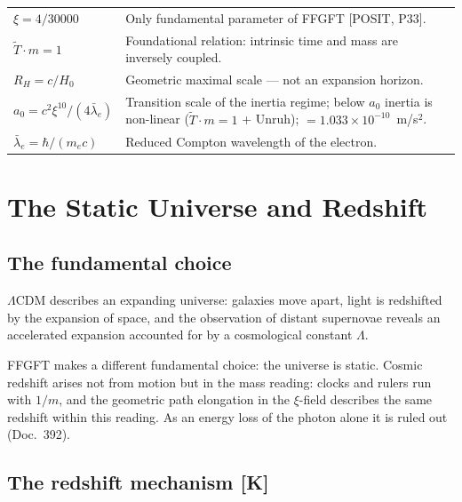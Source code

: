 \medskip
\begin{tabular}{@{}lp{10.5cm}}
$\xi = 4/30000$          & Only fundamental parameter of FFGFT
                           [POSIT, P33]. \\[4pt]
$\tilde T \cdot m = 1$   & Foundational relation: intrinsic time and
                           mass are inversely coupled. \\[4pt]
$R_H = c/H_0$            & Geometric maximal scale — not an expansion
                           horizon. \\[4pt]
$a_0 = c^2\xi^{10}/(4\bar\lambda_e)$
                         & Transition scale of the inertia regime;
                           below $a_0$ inertia is non-linear
                           ($\tilde T\cdot m=1$ + Unruh);
                           $= 1.033\times10^{-10}$~m/s$^2$. \\[4pt]
$\bar\lambda_e = \hbar/(m_e c)$
                         & Reduced Compton wavelength of the electron. \\
\end{tabular}

\chapter{The Static Universe and Redshift}

\section{The fundamental choice}

$\Lambda$CDM describes an expanding universe: galaxies move apart, light
is redshifted by the expansion of space, and the observation of distant
supernovae reveals an accelerated expansion accounted for by a cosmological
constant $\Lambda$.

FFGFT makes a different fundamental choice: the universe is static.
Cosmic redshift arises not from motion but in the mass reading: clocks and
rulers run with $1/m$, and the geometric path elongation in the $\xi$-field
describes the same redshift within this reading. As an energy loss of the
photon alone it is ruled out (Doc.~392).

\section{The redshift mechanism [K]}

